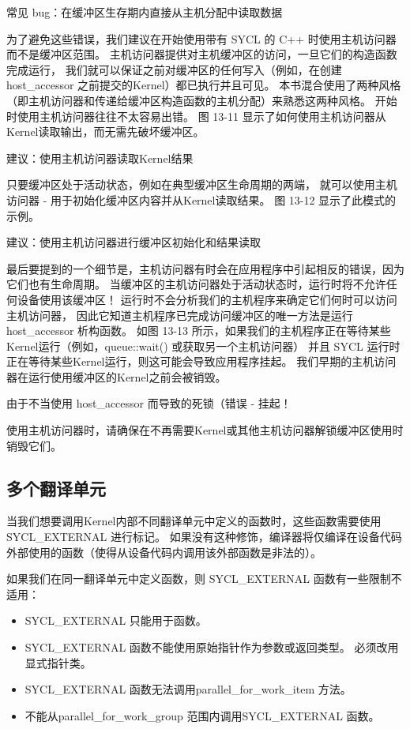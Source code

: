 {\color{red} 常见 bug：在缓冲区生存期内直接从主机分配中读取数据}

为了避免这些错误，我们建议在开始使用带有 SYCL 的 C++ 时使用主机访问器而不是缓冲区范围。 
主机访问器提供对主机缓冲区的访问，一旦它们的构造函数完成运行，
我们就可以保证之前对缓冲区的任何写入（例如，在创建 host\_accessor 之前提交的Kernel）都已执行并且可见。 
本书混合使用了两种风格（即主机访问器和传递给缓冲区构造函数的主机分配）来熟悉这两种风格。 
开始时使用主机访问器往往不太容易出错。 图 13-11 显示了如何使用主机访问器从Kernel读取输出，而无需先破坏缓冲区。

{\color{red} 建议：使用主机访问器读取Kernel结果}

只要缓冲区处于活动状态，例如在典型缓冲区生命周期的两端，
就可以使用主机访问器 - 用于初始化缓冲区内容并从Kernel读取结果。 图 13-12 显示了此模式的示例。

{\color{red} 建议：使用主机访问器进行缓冲区初始化和结果读取}

最后要提到的一个细节是，主机访问器有时会在应用程序中引起相反的错误，因为它们也有生命周期。 
当缓冲区的主机访问器处于活动状态时，运行时将不允许任何设备使用该缓冲区！ 
运行时不会分析我们的主机程序来确定它们何时可以访问主机访问器，
因此它知道主机程序已完成访问缓冲区的唯一方法是运行 host\_accessor 析构函数。 
如图 13-13 所示，如果我们的主机程序正在等待某些Kernel运行（例如，queue::wait() 或获取另一个主机访问器）
并且 SYCL 运行时正在等待某些Kernel运行，则这可能会导致应用程序挂起。 
我们早期的主机访问器在运行使用缓冲区的Kernel之前会被销毁。

{\color{red} 由于不当使用 host\_accessor 而导致的死锁（错误 - 挂起！}

\begin{remark}
	使用主机访问器时，请确保在不再需要Kernel或其他主机访问器解锁缓冲区使用时销毁它们。
\end{remark}

\subsection{多个翻译单元}
当我们想要调用Kernel内部不同翻译单元中定义的函数时，这些函数需要使用 SYCL\_EXTERNAL 进行标记。 
如果没有这种修饰，编译器将仅编译在设备代码外部使用的函数（使得从设备代码内调用该外部函数是非法的）。

如果我们在同一翻译单元中定义函数，则 SYCL\_EXTERNAL 函数有一些限制不适用：

\begin{itemize}
	\item SYCL\_EXTERNAL 只能用于函数。

	\item SYCL\_EXTERNAL 函数不能使用原始指针作为参数或返回类型。 必须改用显式指针类。

	\item SYCL\_EXTERNAL 函数无法调用parallel\_for\_work\_item 方法。

	\item 不能从parallel\_for\_work\_group 范围内调用SYCL\_EXTERNAL 函数。
\end{itemize}

